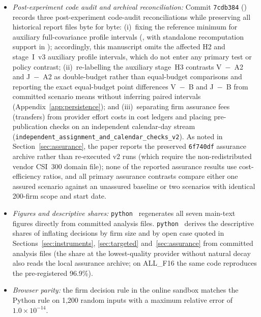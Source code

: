 \documentclass[11pt]{article}
\begin{document}
\begin{itemize}[leftmargin=*]
\item \emph{Post-experiment code audit and archival reconciliation:} Commit \texttt{7cdb384} () records three post-experiment code-audit reconciliations while preserving all historical report files byte for byte: (i)~fixing the reference minimum for auxiliary full-covariance profile intervals (, with standalone recomputation support in ); accordingly, this manuscript omits the affected H2 and stage~I~v3 auxiliary profile intervals, which do not enter any primary test or policy contrast; (ii)~re-labelling the auxiliary stage~H3 contrasts V~$-$~A2 and J~$-$~A2 as double-budget rather than equal-budget comparisons and reporting the exact equal-budget point differences V~$-$~B and J~$-$~B from committed scenario means without inferring paired intervals (Appendix~\ref{app:persistence}); and (iii)~separating firm assurance fees (transfers) from provider effort costs in cost ledgers and placing pre-publication checks on an independent calendar-day stream (\texttt{independent\_assignment\_and\_calendar\_checks\_v2}). As noted in Section~\ref{sec:assurance}, the paper reports the preserved \texttt{6f740df} assurance archive rather than re-executed v2 runs (which require the non-redistributed vendor CSI~300 domain file); none of the reported assurance results use cost-efficiency ratios, and all primary assurance contrasts compare either one assured scenario against an unassured baseline or two scenarios with identical 200-firm scope and start date.
\item \emph{Figures and descriptive shares:} \texttt{python}~ regenerates all seven main-text figures directly from committed analysis files. \texttt{python}~ derives the descriptive shares of inflating decisions by firm size and by open case quoted in Sections~\ref{sec:instruments}, \ref{sec:targeted} and~\ref{sec:assurance} from committed analysis files (the share at the lowest-quality provider without natural decay also reads the local assurance archive; on ALL\_F16 the same code reproduces the pre-registered 96.9\%).
\item \emph{Browser parity:} the firm decision rule in the online sandbox matches the Python rule on 1,200 random inputs with a maximum relative error of $1.0\times10^{-14}$.
\end{itemize}
\end{document}
